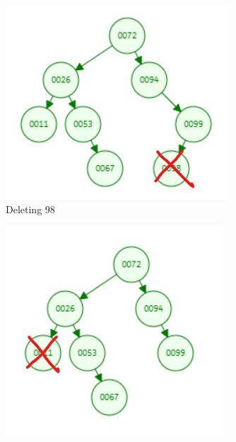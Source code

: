 \documentclass[12pt, a4paper]{article}
\begin{document}
\begin{enumerate}
\begin{enumerate}
\begin{figure}[h!]
\begin{subfigure}[b]{0.3\textwidth}
          \label{fig:2-2-d}
        \end{subfigure}
        \hfill
        \begin{subfigure}[b]{0.3\textwidth}
          \centering
          \includegraphics[width=\textwidth]{2-2-e}
          \caption{Deleting 98}
          \label{fig:2-2-e}
        \end{subfigure}
        \hfill
        \begin{subfigure}[b]{0.3\textwidth}
          \centering
          \includegraphics[width=\textwidth]{2-2-f}

\end{subfigure}
\end{figure}
\end{enumerate}
\end{enumerate}
\end{document}
